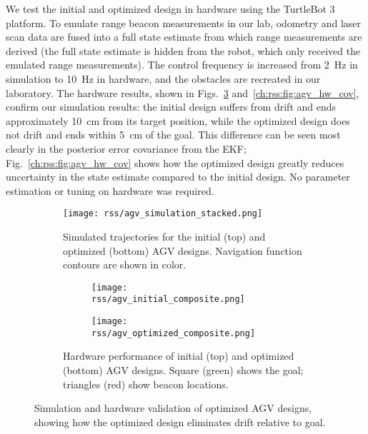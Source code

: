 We test the initial and optimized design in hardware using the TurtleBot 3 platform. To emulate range beacon measurements in our lab, odometry and laser scan data are fused into a full state estimate from which range measurements are derived (the full state estimate is hidden from the robot, which only received the emulated range measurements). The control frequency is increased from \SI{2}{Hz} in simulation to \SI{10}{Hz} in hardware, and the obstacles are recreated in our laboratory. The hardware results, shown in Figs.~\ref{ch:rss:fig:agv_hw} and~\ref{ch:rss:fig:agv_hw_cov}, confirm our simulation results: the initial design suffers from drift and ends approximately \SI{10}{cm} from its target position, while the optimized design does not drift and ends within \SI{5}{cm} of the goal. This difference can be seen most clearly in the posterior error covariance from the EKF;  Fig.~\ref{ch:rss:fig:agv_hw_cov} shows how the optimized design greatly reduces uncertainty in the state estimate compared to the initial design. No parameter estimation or tuning on hardware was required.

\begin{figure}[tb]
	\centering
	\begin{subfigure}[c]{0.45\linewidth}
		\centering
		\texttt{[image: rss/agv\_simulation\_stacked.png]}
		\caption{Simulated trajectories for the initial (top) and optimized (bottom) AGV designs. Navigation function contours are shown in color.}
		\label{ch:rss:fig:agv_representative_trajectories}
	\end{subfigure}
	\quad
	\begin{subfigure}[c]{0.45\linewidth}
		\begin{subfigure}[t]{\linewidth}
			\centering
			\texttt{[image: rss/agv\_initial\_composite.png]}
		\end{subfigure}

		\begin{subfigure}[t]{\linewidth}
			\centering
			\texttt{[image: rss/agv\_optimized\_composite.png]}
		\end{subfigure}
		\caption{Hardware performance of initial (top) and optimized (bottom) AGV designs. Square (green) shows the goal; triangles (red) show beacon locations.}
		\label{ch:rss:fig:agv_hw}
	\end{subfigure}
	\caption{Simulation and hardware validation of optimized AGV designs, showing how the optimized design eliminates drift relative to goal.}
\end{figure}

